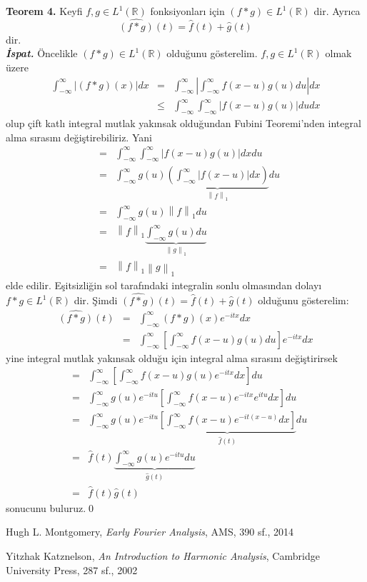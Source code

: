 \documentclass[a4paper, 10pt]{article}
\begin{document}
\textbf{Teorem 4.} Keyfi $f,g \in L^1(\mathbb{R})$ fonksiyonları için $\left( f\ast g \right) \in L^1(\mathbb{R})$ dir. Ayrıca 
$$ \widehat{\left( f\ast g \right)}(t) = \widehat{f}(t) + \widehat{g}(t)  $$
dir. \\
\textit{\textbf{İspat.}} 
Öncelikle $\left( f\ast g \right) \in L^1(\mathbb{R})$ olduğunu gösterelim. $f, g \in L^1(\mathbb{R})$ olmak üzere
	\begin{eqnarray*} 
		\int_{-\infty}^{\infty} \left| \left( f\ast g \right)(x) \right|dx &=&  \int_{-\infty}^{\infty} \left| \int_{-\infty}^{\infty} f(x-u)g(u)du \right|dx \\
		&\leq &  \int_{-\infty}^{\infty} \int_{-\infty}^{\infty} \left| f(x-u)g(u) \right| du dx 
	\end{eqnarray*}
olup çift katlı integral mutlak yakınsak olduğundan Fubini Teoremi'nden integral alma sırasını değiştirebiliriz. Yani
	\begin{eqnarray*}
	&=&  \int_{-\infty}^{\infty} \int_{-\infty}^{\infty} \left| f(x-u)g(u) \right| dx du \\
	&=&  \int_{-\infty}^{\infty} g(u) \underbrace{\left( \int_{-\infty}^{\infty} \left| f(x-u) \right| dx \right) }_{\left \| f \right \|_{1}} du \\
	&=&  \int_{-\infty}^{\infty} g(u)\left \| f \right \|_{1} du \\
	&=& \left \| f \right \|_{1} \underbrace{\int_{-\infty}^{\infty} g(u) du}_{{\left \| g \right \|}_{1}} \\
	&=& \left \| f \right \|_{1}\left \| g \right \|_{1}
	\end{eqnarray*}
elde edilir. Eşitsizliğin sol tarafındaki integralin sonlu olmasından dolayı $f\ast g \in L^1(\mathbb{R})$ dir. 
Şimdi $ \widehat{\left( f\ast g \right)}(t) = \widehat{f}(t) + \widehat{g}(t)  $ olduğunu gösterelim:
	\begin{eqnarray*}
	\widehat{\left( f\ast g \right)}(t) &=& \int_{-\infty}^{\infty}  \left( f\ast g \right)(x)  e^{-itx} dx\\
	 &=&  \int_{-\infty}^{\infty} \left[ \int_{-\infty}^{\infty}  f(x-u)g(u) du \right] e^{-itx} dx 
	\end{eqnarray*}
yine integral mutlak yakınsak olduğu için integral alma sırasını değiştirirsek
	\begin{eqnarray*}
	 &=& \int_{-\infty}^{\infty} \left[ \int_{-\infty}^{\infty} f(x-u)g(u) e^{-itx} dx \right] du \\
	 &=&  \int_{-\infty}^{\infty} g(u) e^{-itu} \left[ \int_{-\infty}^{\infty}  f(x-u)e^{-itx} e^{itu} dx \right] du \\
	 &=&  \int_{-\infty}^{\infty} g(u) e^{-itu} \underbrace{\left[ \int_{-\infty}^{\infty}  f(x-u)e^{-it(x-u)} dx \right]}_{\widehat{f}(t)} du \\
	 &=&  \widehat{f}(t) \underbrace{\int_{-\infty}^{\infty} g(u) e^{-itu} du}_{\widehat{g}(t)} \\
	 &=&  \widehat{f}(t)\widehat{g}(t)	 
	\end{eqnarray*}
sonucunu buluruz.\qed

\begin{thebibliography}{9}
Hugh L. Montgomery,
\textit{Early Fourier Analysis},
AMS,
390 sf.,
2014

Yitzhak Katznelson,
\textit{An Introduction to Harmonic Analysis},
Cambridge University Press,
287 sf.,
2002

\end{thebibliography}
\end{document}
